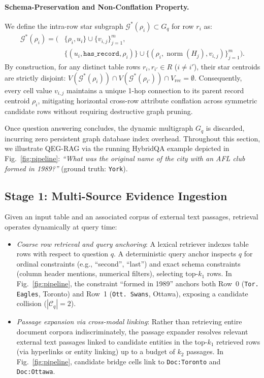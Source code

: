 \documentclass[runningheads]{llncs}
\begin{document}
\paragraph{Schema-Preservation and Non-Conflation Property.}
We define the intra-row star subgraph $\mathcal{G}^*(\rho_i) \subset G_q$ for row $r_i$ as:
\begin{equation}
\label{eq:star-subgraph}
\begin{aligned}
\mathcal{G}^*(\rho_i) = \Big( &\{\rho_i, u_i\} \cup \{v_{i,j}\}_{j=1}^m, \\
&\{(u_i, \texttt{has\_record}, \rho_i)\} \cup \{(\rho_i, \operatorname{norm}(H_j), v_{i,j})\}_{j=1}^m \Big).
\end{aligned}
\end{equation}
By construction, for any distinct table rows $r_i, r_{i'} \in R$ ($i \neq i'$), their star centroids are strictly disjoint: $V(\mathcal{G}^*(\rho_i)) \cap V(\mathcal{G}^*(\rho_{i'})) \cap V_{\text{rec}} = \emptyset$. Consequently, every cell value $v_{i,j}$ maintains a unique 1-hop connection to its parent record centroid $\rho_i$, mitigating horizontal cross-row attribute conflation across symmetric candidate rows without requiring destructive graph pruning.

Once question answering concludes, the dynamic multigraph $G_q$ is discarded, incurring zero persistent graph database index overhead. Throughout this section, we illustrate QEG-RAG via the running HybridQA example depicted in Fig.~\ref{fig:pipeline}: \textit{``What was the original name of the city with an AFL club formed in 1989?''} (ground truth: \texttt{York}).

\subsection{Stage 1: Multi-Source Evidence Ingestion}
\label{sec:method-retrieval}
Given an input table and an associated corpus of external text passages, retrieval operates dynamically at query time:
\begin{itemize}[leftmargin=1.5em]
    \item \emph{Coarse row retrieval and query anchoring}: A lexical retriever indexes table rows with respect to question $q$. A deterministic query anchor inspects $q$ for ordinal constraints (e.g., ``second'', ``last'') and exact schema constraints (column header mentions, numerical filters), selecting top-$k_1$ rows. In Fig.~\ref{fig:pipeline}, the constraint ``formed in 1989'' anchors both Row~0 (\texttt{Tor. Eagles}, Toronto) and Row~1 (\texttt{Ott. Swans}, Ottawa), exposing a candidate collision ($|\mathcal{C}_q| = 2$).
    \item \emph{Passage expansion via cross-modal linking}: Rather than retrieving entire document corpora indiscriminately, the passage expander resolves relevant external text passages linked to candidate entities in the top-$k_1$ retrieved rows (via hyperlinks or entity linking) up to a budget of $k_2$ passages. In Fig.~\ref{fig:pipeline}, candidate bridge cells link to \texttt{Doc:Toronto} and \texttt{Doc:Ottawa}.
\end{itemize}
\end{document}
